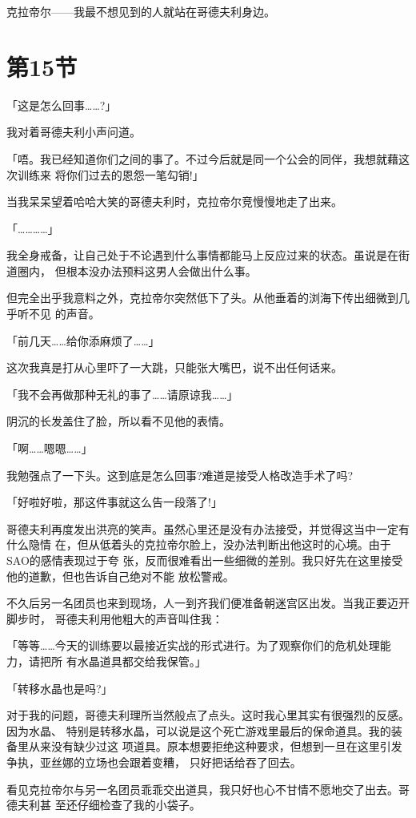 \documentclass[11pt]{book}
\begin{document}
克拉帝尔——我最不想见到的人就站在哥德夫利身边。
\section{第15节}
\label{sec:orga19ee21}
「这是怎么回事……?」

我对着哥德夫利小声问道。

「唔。我已经知道你们之间的事了。不过今后就是同一个公会的同伴，我想就藉这次训练来
将你们过去的恩怨一笔勾销!」

当我呆呆望着哈哈大笑的哥德夫利时，克拉帝尔竞慢慢地走了出来。

「…………」

我全身戒备，让自己处于不论遇到什么事情都能马上反应过来的状态。虽说是在街道圈内，
但根本没办法预料这男人会做出什么事。

但完全出乎我意料之外，克拉帝尔突然低下了头。从他垂着的浏海下传出细微到几乎听不见
的声音。

「前几天……给你添麻烦了……」

这次我真是打从心里吓了一大跳，只能张大嘴巴，说不出任何话来。

「我不会再做那种无礼的事了……请原谅我……」

阴沉的长发盖住了脸，所以看不见他的表情。

「啊……嗯嗯……」

我勉强点了一下头。这到底是怎么回事?难道是接受人格改造手术了吗?

「好啦好啦，那这件事就这么告一段落了!」

哥德夫利再度发出洪亮的笑声。虽然心里还是没有办法接受，并觉得这当中一定有什么隐情
在，但从低着头的克拉帝尔脸上，没办法判断出他这时的心境。由于SAO的感情表现过于夸
张，反而很难看出一些细微的差别。我只好先在这里接受他的道歉，但也告诉自己绝对不能
放松警戒。

不久后另一名团员也来到现场，人一到齐我们便准备朝迷宫区出发。当我正要迈开脚步时，
哥德夫利用他粗大的声音叫住我：

「等等……今天的训练要以最接近实战的形式进行。为了观察你们的危机处理能力，请把所
有水晶道具都交给我保管。」

「转移水晶也是吗?」

对于我的问题，哥德夫利理所当然般点了点头。这时我心里其实有很强烈的反感。因为水晶、
特别是转移水晶，可以说是这个死亡游戏里最后的保命道具。我的装备里从来没有缺少过这
项道具。原本想要拒绝这种要求，但想到一旦在这里引发争执，亚丝娜的立场也会跟着变糟，
只好把话给吞了回去。

看见克拉帝尔与另一名团员乖乖交出道具，我只好也心不甘情不愿地交了出去。哥德夫利甚
至还仔细检查了我的小袋子。
\end{document}
